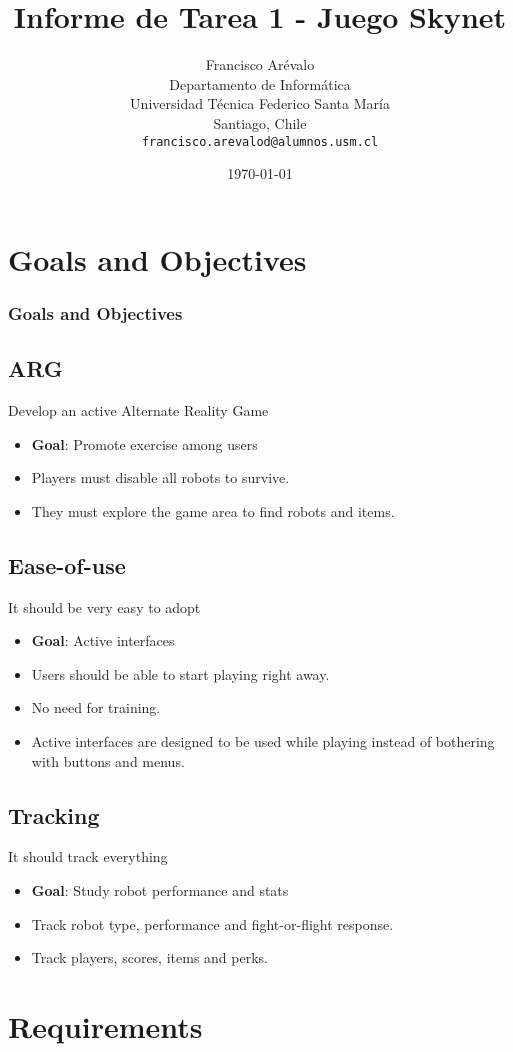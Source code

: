 \documentclass{beamer}
\title{Informe de Tarea 1 - Juego Skynet}
\author{Francisco Ar\'evalo\\
  Departamento de Inform\'atica\\
  Universidad T\'ecnica Federico Santa Mar\'ia\\
  Santiago, Chile\\
  \texttt{francisco.arevalod@alumnos.usm.cl}}
\date{\today}
\begin{document}
\maketitle
\tableofcontents
\section{Goals and Objectives}
\begin{frame}
\frametitle{Goals and Objectives}
\subsection{ARG}
Develop an active Alternate Reality Game
\begin{itemize}
	\item \textbf{Goal}: Promote exercise among users
	\item Players must disable all robots to survive. 
	\item They must explore the game area to find robots and items.
\end{itemize}
\subsection{Ease-of-use}
It should be very easy to adopt
\begin{itemize}
	\item \textbf{Goal}: Active interfaces
	\item Users should be able to start playing right away. 
	\item No need for training.
	\item Active interfaces are designed to be used while playing instead of bothering with buttons and menus.
\end{itemize}
\subsection{Tracking}
It should track everything
\begin{itemize}
	\item \textbf{Goal}: Study robot performance and stats
	\item Track robot type, performance and fight-or-flight response.
	\item Track players, scores, items and perks.
\end{itemize}
\end{frame}
\section{Requirements}
\end{document}
